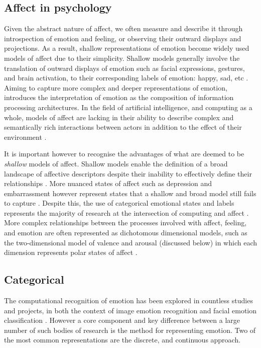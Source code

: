 \documentclass{article}
\begin{document}
\subsection{Affect in psychology}

Given the abstract nature of affect, we often measure and describe it through introspection of emotion and feeling, or observing their outward displays and projections.
As a result, shallow representations of emotion become widely used models of affect due to their simplicity.
Shallow models generally involve the translation of outward displays of emotion such as facial expressions, gestures, and brain activation, to their corresponding labels of emotion: happy, sad, etc \citep{sloman2001beyond}.
Aiming to capture more complex and deeper representations of emotion, \citet{sloman2001beyond} introduces the interpretation of emotion as the composition of information processing architectures.
In the field of artificial intelligence, and computing as a whole, models of affect are lacking in their ability to describe complex and semantically rich interactions between actors in addition to the effect of their environment \citep{sloman2001beyond}.

It is important however to recognise the advantages of what are deemed to be \textit{shallow} models of affect.
Shallow models enable the definition of a broad landscape of affective descriptors despite their inability to effectively define their relationships \citep{sloman2001beyond}.
More nuanced states of affect such as depression and embarrassment however represent states that a shallow and broad model still fails to capture \citep{gunes2011emotion}.
Despite this, the use of categorical emotional states and labels represents the majority of research at the intersection of computing and affect \citep{gunes2011emotion}.
More complex relationships between the processes involved with affect, feeling, and emotion are often represented as dichotomous dimensional models, such as the two-dimensional model of valence and arousal (discussed below) in which each dimension represents polar states of affect \citep{grandjean2008conscious}.


\subsection{Categorical}

The computational recognition of emotion has been explored in countless studies and projects, in both the context of image emotion recognition \citep{machajdik2010affective,zhao2014exploring,kim2018building} and facial emotion classification \citep{mollahosseini2016going}.
However a core component and key difference between a large number of such bodies of research is the method for representing emotion.
Two of the most common representations are the discrete, and continuous approach.
\end{document}
